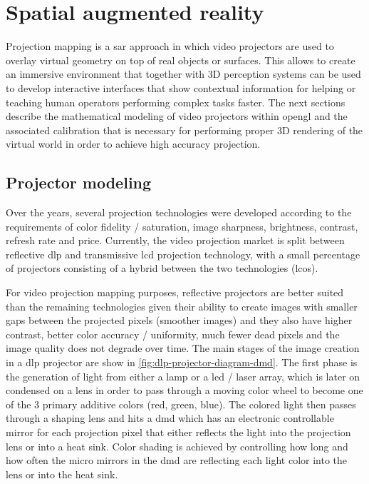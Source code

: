 \section{Spatial augmented reality}\label{sec:sar}

Projection mapping is a \gls{sar} \cite{Bimber2005} approach in which video projectors are used to overlay virtual geometry on top of real objects or surfaces. This allows to create an immersive environment that together with 3D perception systems can be used to develop interactive interfaces that show contextual information for helping or teaching human operators performing complex tasks faster. The next sections describe the mathematical modeling of video projectors within \gls{opengl} and the associated calibration that is necessary for performing proper 3D rendering of the virtual world in order to achieve high accuracy projection.


\subsection{Projector modeling}

Over the years, several projection technologies were developed according to the requirements of color fidelity / saturation, image sharpness, brightness, contrast, refresh rate and price. Currently, the video projection market is split between reflective \gls{dlp} and transmissive \gls{lcd} projection technology, with a small percentage of projectors consisting of a hybrid between the two technologies (\gls{lcos}).

For video projection mapping purposes, reflective projectors are better suited than the remaining technologies given their ability to create images with smaller gaps between the projected pixels (smoother images) and they also have higher contrast, better color accuracy / uniformity, much fewer dead pixels and the image quality does not degrade over time. The main stages of the image creation in a \gls{dlp} projector are show in \cref{fig:dlp-projector-diagram-dmd}. The first phase is the generation of light from either a lamp or a \gls{led} / laser array, which is later on condensed on a lens in order to pass through a moving color wheel to become one of the 3 primary additive colors (red, green, blue). The colored light then passes through a shaping lens and hits a \gls{dmd} which has an electronic controllable mirror for each projection pixel that either reflects the light into the projection lens or into a heat sink. Color shading is achieved by controlling how long and how often the micro mirrors in the \gls{dmd} are reflecting each light color into the lens or into the heat sink.

